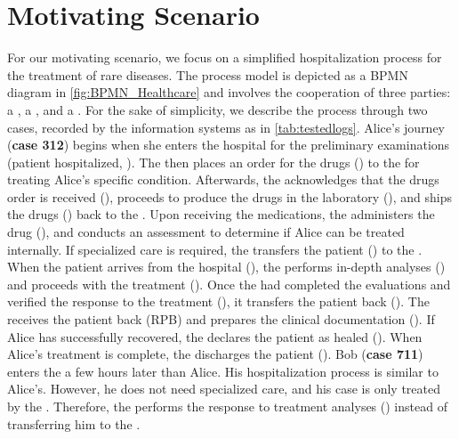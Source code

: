 \section{Motivating Scenario}\label{sec:motivating}
For our motivating scenario, we focus on a simplified hospitalization process for the treatment of rare diseases.
The process model is depicted as a BPMN diagram in \cref{fig:BPMN_Healthcare} and involves the cooperation of three parties: a , a , and a .
For the sake of simplicity, we describe the process through two cases, recorded by the information systems as in \cref{tab:testedlogs}. Alice's journey (\textbf{case 312}) begins when she enters the hospital for the preliminary examinations (patient hospitalized, ). The  then places an order for the drugs () to the  for  treating Alice's specific condition. Afterwards, the  acknowledges that the drugs order is received (), proceeds to produce the drugs in the laboratory (), and ships the drugs () back to the . Upon receiving the medications, the  administers the drug (), and conducts an assessment to determine if Alice can be treated internally. If specialized care is required, the  transfers the patient () to the . When the patient arrives from the hospital (), the  performs in-depth analyses () and proceeds with the treatment (). Once the  had completed the evaluations and verified the response to the treatment (), it transfers the patient back (). The  receives the patient back \Activ(RPB) and prepares the clinical documentation (). If Alice has successfully recovered, the  declares the patient as healed (). When Alice's treatment is complete, the  discharges the patient (). 
%
Bob (\textbf{case 711}) enters the  a few hours later than Alice. His hospitalization process is similar to Alice's. However, he does not need specialized care, and his case is only treated by the . Therefore, the  performs the response to treatment analyses () instead of transferring him to the . 

